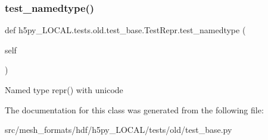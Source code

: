 \subsubsection{\texorpdfstring{test\+\_\+namedtype()}{test\_namedtype()}}
{\footnotesize\ttfamily def h5py\+\_\+\+L\+O\+C\+A\+L.\+tests.\+old.\+test\+\_\+base.\+Test\+Repr.\+test\+\_\+namedtype (\begin{DoxyParamCaption}\item[{}]{self }\end{DoxyParamCaption})}

\begin{DoxyVerb}Named type repr() with unicode \end{DoxyVerb}
 

The documentation for this class was generated from the following file\+:\begin{DoxyCompactItemize}
\item 
src/mesh\+\_\+formats/hdf/h5py\+\_\+\+L\+O\+C\+A\+L/tests/old/test\+\_\+base.\+py\end{DoxyCompactItemize}
